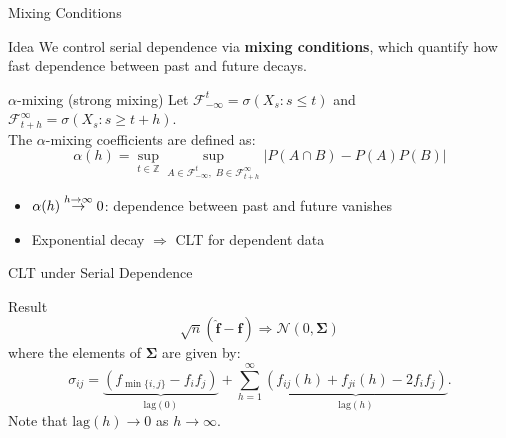 \documentclass{beamer}
\begin{document}
\begin{frame}{Mixing Conditions}

\begin{block}{Idea}
We control serial dependence via \textbf{mixing conditions}, which quantify how fast dependence between past and future decays.
\end{block}

\vspace{0.4cm}

\begin{block}{$\alpha$-mixing (strong mixing)}
Let $\mathcal{F}_{-\infty}^t = \sigma(X_s : s \leq t)$ and $\mathcal{F}_{t+h}^{\infty} = \sigma(X_s : s \geq t+h)$.\\

The $\alpha$-mixing coefficients are defined as:
\[
\alpha(h) = \sup_{t \in \mathbb{Z}} \sup_{A \in \mathcal{F}_{-\infty}^t,\; B \in \mathcal{F}_{t+h}^{\infty}}
\big| P(A \cap B) - P(A)P(B) \big|
\]
\end{block}

\vspace{0.3cm}

\begin{itemize}
    \item $\alpha(h) \overset{\tiny h \to \infty}{\rightarrow} 0$: dependence between past and future vanishes
    \item Exponential decay $\Rightarrow$ CLT for dependent data
\end{itemize}

\end{frame}
\begin{frame}{CLT under Serial Dependence}
    \begin{block}{Result}
    \[\sqrt{n}(\hat{\boldsymbol{f}} - \boldsymbol{f}) \Rightarrow \mathcal{N}(0, \boldsymbol{\Sigma})\]
    where the elements of $\boldsymbol{\Sigma}$ are given by:
    \[\sigma_{ij} = \underbrace{\left(f_{\min\{i,j\}}- f_i f_j\right)}_{\text{lag}(0)} + \sum_{h=1}^{\infty} \underbrace{\left(f_{ij}(h) + f_{ji}(h) - 2f_if_j\right)}_{\text{lag}(h)}.\]
    Note that $\text{lag}(h) \rightarrow 0$ as $h \rightarrow \infty$.
    \end{block}
\end{frame}
\end{document}
